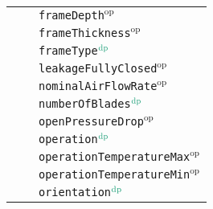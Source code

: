{\begin{tabular}{lll}
                                  &                                                                                                        & \texttt{frameDepth}$^\textrm{op}$                \\
                                  &                                                                                                        & \texttt{frameThickness}$^\textrm{op}$            \\
                                  &                                                                                                        & \texttt{frameType}$\color{DarkGreen}^\textrm{dp}$                 \\
                                  &                                                                                                        & \texttt{leakageFullyClosed}$^\textrm{op}$        \\
                                  &                                                                                                        & \texttt{nominalAirFlowRate}$^\textrm{op}$        \\
                                  &                                                                                                        & \texttt{numberOfBlades}$\color{DarkGreen}^\textrm{dp}$            \\
                                  &                                                                                                        & \texttt{openPressureDrop}$^\textrm{op}$          \\
                                  &                                                                                                        & \texttt{operation}$\color{DarkGreen}^\textrm{dp}$                 \\
                                  &                                                                                                        & \texttt{operationTemperatureMax}$^\textrm{op}$   \\
                                  &                                                                                                        & \texttt{operationTemperatureMin}$^\textrm{op}$   \\
                                  &                                                                                                        & \texttt{orientation}$\color{DarkGreen}^\textrm{dp}$               \\

\end{tabular}}
